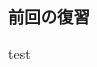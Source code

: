 \documentclass[dvipdfmx,12pt]{standalone}
\begin{document}
\begin{frame}\frametitle{前回の復習}
test
\end{frame}
\end{document}
